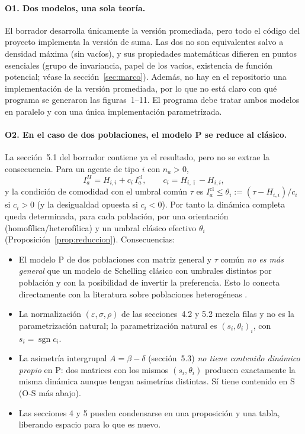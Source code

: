 \documentclass[11pt,a4paper]{article}
\theoremstyle{plain}
\theoremstyle{definition}
\theoremstyle{remark}
\newcommand{\Icl}{I^{\mathrm{cl}}}
\newcommand{\modP}{\textsf{P}}
\newcommand{\modS}{\textsf{S}}
\begin{document}
\paragraph{O1. Dos modelos, una sola teoría.}
El borrador desarrolla únicamente la versión promediada, pero todo el código del
proyecto implementa la versión de suma. Las dos no son equivalentes salvo a
densidad máxima (sin vacíos), y sus propiedades matemáticas difieren en puntos
esenciales (grupo de invariancia, papel de los vacíos, existencia de función
potencial; véase la sección~\ref{sec:marco}). Además, no hay en el repositorio
una implementación de la versión promediada, por lo que no está claro con qué
programa se generaron las figuras~1--11. El programa debe tratar ambos modelos
en paralelo y con una única implementación parametrizada.

\paragraph{O2. En el caso de dos poblaciones, el modelo \modP{} se reduce al
clásico.}
La sección~5.1 del borrador contiene ya el resultado, pero no se extrae la
consecuencia. Para un agente de tipo $i$ con $n_a>0$,
\[
  I^H_a = H_{i,i} + c_i\,\Icl_a ,\qquad c_i = H_{i,\bar\imath}-H_{i,i},
\]
y la condición de comodidad con el umbral común $\tau$ es
$\Icl_a\le\theta_i:=(\tau-H_{i,i})/c_i$ si $c_i>0$ (y la desigualdad opuesta si
$c_i<0$). Por tanto la dinámica completa queda determinada, para cada población,
por una orientación (homofílica/heterofílica) y un umbral clásico efectivo
$\theta_i$ (Proposición~\ref{prop:reduccion}). Consecuencias:
\begin{itemize}
  \item El modelo \modP{} de dos poblaciones con matriz general y $\tau$ común
  \emph{no es más general} que un modelo de Schelling clásico con umbrales
  distintos por población y con la posibilidad de invertir la preferencia. Esto
  lo conecta directamente con la literatura sobre poblaciones heterogéneas
  \cite{HatnaBenenson2015,AcunaGoles2025}.
  \item La normalización $(\varepsilon,\sigma,\rho)$ de las secciones~4.2 y
  5.2 mezcla filas y no es la parametrización natural; la parametrización
  natural es $(s_i,\theta_i)_{i}$, con $s_i=\operatorname{sgn}c_i$.
  \item La asimetría intergrupal $A=\beta-\delta$ (sección~5.3) \emph{no tiene
  contenido dinámico propio} en \modP: dos matrices con los mismos
  $(s_i,\theta_i)$ producen exactamente la misma dinámica aunque tengan
  asimetrías distintas. Sí tiene contenido en \modS{} (O-S más abajo).
  \item Las secciones 4 y 5 pueden condensarse en una proposición y una tabla,
  liberando espacio para lo que es nuevo.
\end{itemize}
\end{document}
